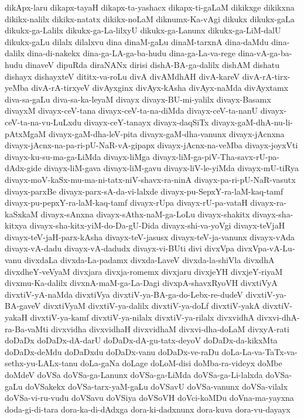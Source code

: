 {dikApx-laru
dikapx-tayaH
dikapx-ta-yashacx
dikapx-ti-gaLaM
dikikxge
dikikxna
dikikx-nalilx
dikikx-natatx
dikikx-noLaM
diknumx-Ka-vAgi
dikukx
dikukx-gaLa
dikukx-ga-Lalilx
dikukx-ga-La-lilxyU
dikukx-ga-Lanunx
dikukx-ga-LiM-dalU
dikukx-gaLu
dilalx
dilalxvu
dina
dinaM-gaLu
dinaM-tarxnA
dina-daMdu
dina-dalilx
dina-di-nakekx
dina-ga-LA-ga-ba-hudu
dina-ga-La-va-rege
dina-vA-ga-ba-hudu
dinaveV
dipuRda
diraNANx
dirisi
dishA-BA-ga-dalilx
dishAM
dishatu
dishayx
dishayxteV
dititx-va-roLu
divA
divAMdhAH
divA-kareV
divA-rA-tirx-yeMba
divA-rA-tirxyeV
divAyxginx
divAyx-kAsha
divAyx-naMda
divAyxtamx
diva-sa-gaLu
diva-sa-ka-leyaM
divayx
divayx-BU-mi-yalilx
divayx-Basamx
divayxM
divayx-ceV-tana
divayx-ceV-ta-na-diMda
divayx-ceV-ta-nanU
divayx-ceV-ta-na-vu-LuLxdu
divayx-ceY-tanayx
divayx-daqSiTx
divayx-gaM-dhA-nu-li-pAtxMgaM
divayx-gaM-dha-leV-pita
divayx-gaM-dha-vanunx
divayx-jAcnxna
divayx-jAcnx-na-pa-ri-pU-NaR-vA-gipapx
divayx-jAcnx-na-veMba
divayx-joyxVti
divayx-ku-su-ma-ga-LiMda
divayx-liMga
divayx-liM-ga-piV-Tha-savx-rU-pa-dAdx-gide
divayx-liM-gava
divayx-liM-gavu
divayx-liV-le-yiMda
divayx-mU-tiRya
divayx-moV-kaSx-mu-ma-ni-tatx-niV-shavx-ra-ninA
divayx-pa-ri-pU-NaR-vasutx
divayx-parxBe
divayx-parx-sA-da-vi-lalxde
divayx-pu-SepxY-ra-laM-kaq-tamf
divayx-pu-pepxY-ra-laM-kaq-tamf
divayx-rUpa
divayx-rU-pa-vataH
divayx-ra-kaSxkaM
divayx-sAnxna
divayx-sAthx-naM-ga-LoLu
divayx-shakitx
divayx-sha-kitxya
divayx-sha-kitx-yiM-do-Da-gU-Dida
divayx-shi-va-yoVgi
divayx-teVjaH
divayx-teV-jaH-parx-kAsha
divayx-teV-jasusx
divayx-teV-ja-vanunx
divayx-vAda
divayx-vA-dadu
divayx-vA-dadudx
divayx-vi-BUti
divi
divxVpa
divxVpa-vA-Lu-vanu
divxdaLa
divxda-La-padamx
divxda-LaveV
divxda-la-shiVla
divxdhA
divxdheY-veVyaM
divxjara
divxja-romemx
divxjaru
divxjeYH
divxjeY-riyaM
divxmu-Ka-dalilx
divxnA-maM-ga-La-Dagi
divxpA-shavxRyoVH
divxtiVyA
divxtiV-yA-naMda
divxtiVya
divxtiV-ya-BA-ga-do-Lebx-re-dudeV
divxtiV-ya-BA-gaveV
divxtiVyaM
divxtiV-ya-dalilx
divxtiV-ya-doLf
divxtiV-yakA
divxtiV-yakaH
divxtiV-ya-kamf
divxtiV-ya-nilalx
divxtiV-ya-rilalx
divxvidhA
divxvi-dhA-ra-Ba-vaMti
divxvidha
divxvidhaH
divxvidhaM
divxvi-dha-doLaM
divxyA-rati
doDaDx
doDaDx-dA-darU
doDaDx-dA-gu-tatx-deyoV
doDaDx-da-kikxMta
doDaDx-deMdu
doDaDxdu
doDaDx-vanu
doDaDx-ve-raDu
doLa-La-va-TaTx-va-sethx-yu-LALx-tanu
doLa-gaNa
doLage
doLoM-disi
doMba-ra-videyx
doMbe
doMdeV
doVSa
doVSa-ga-Lanunx
doVSa-ga-LiMda
doVSa-ga-Li-lalxda
doVSa-gaLu
doVSakekx
doVSa-tarx-yaM-gaLu
doVSavU
doVSa-vanunx
doVSa-vilalx
doVSa-vi-ru-vudu
doVSavu
doVSiya
doVSoVH
doVci-koMDu
doVna-ma-yayxna
doda-gi-di-tara
dora-ka-di-dAdxga
dora-ki-dadxnunx
dora-kuva
dora-vu-dayayx
}
